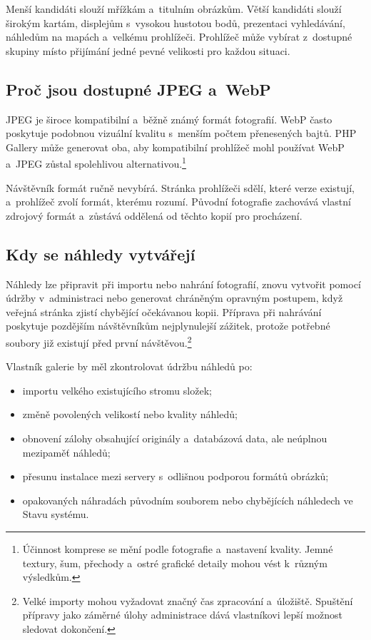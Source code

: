 \documentclass[11pt,a4paper]{article}
\begin{document}
Menší kandidáti slouží mřížkám a~titulním obrázkům. Větší kandidáti slouží
širokým kartám, displejům s~vysokou hustotou bodů, prezentaci vyhledávání,
náhledům na mapách a~velkému prohlížeči. Prohlížeč může vybírat z~dostupné
skupiny místo přijímání jedné pevné velikosti pro každou situaci.

\subsection{Proč jsou dostupné JPEG a~WebP}

JPEG je široce kompatibilní a~běžně známý formát fotografií. WebP často
poskytuje podobnou vizuální kvalitu s~menším počtem přenesených bajtů. PHP
Gallery může generovat oba, aby kompatibilní prohlížeč mohl používat WebP a~JPEG
zůstal spolehlivou alternativou.\footnote{Účinnost komprese se mění podle
fotografie a~nastavení kvality. Jemné textury, šum, přechody a~ostré grafické
detaily mohou vést k~různým výsledkům.}

Návštěvník formát ručně nevybírá. Stránka prohlížeči sdělí, které verze
existují, a~prohlížeč zvolí formát, kterému rozumí. Původní fotografie zachovává
vlastní zdrojový formát a~zůstává oddělená od těchto kopií pro procházení.

\subsection{Kdy se náhledy vytvářejí}

Náhledy lze připravit při importu nebo nahrání fotografií, znovu vytvořit pomocí
údržby v~administraci nebo generovat chráněným opravným postupem, když veřejná
stránka zjistí chybějící očekávanou kopii. Příprava při nahrávání poskytuje
pozdějším návštěvníkům nejplynulejší zážitek, protože potřebné soubory již
existují před první návštěvou.\footnote{Velké importy mohou vyžadovat značný čas
zpracování a~úložiště. Spuštění přípravy jako záměrné úlohy administrace dává
vlastníkovi lepší možnost sledovat dokončení.}

Vlastník galerie by měl zkontrolovat údržbu náhledů po:

\begin{itemize}
  \item importu velkého existujícího stromu složek;
  \item změně povolených velikostí nebo kvality náhledů;
  \item obnovení zálohy obsahující originály a~databázová data, ale neúplnou
  mezipaměť náhledů;
  \item přesunu instalace mezi servery s~odlišnou podporou formátů obrázků;
  \item opakovaných náhradách původním souborem nebo chybějících náhledech ve
  Stavu systému.
\end{itemize}
\end{document}

